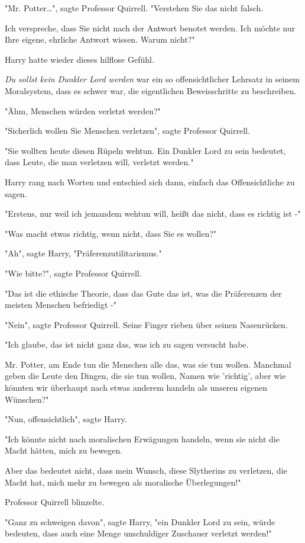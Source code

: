 {"Mr. Potter…", sagte Professor Quirrell. "Verstehen Sie das nicht falsch.

Ich verspreche, dass Sie nicht nach der Antwort benotet werden. Ich möchte nur Ihre eigene, ehrliche Antwort wissen. Warum nicht?"

Harry hatte wieder dieses hilflose Gefühl.

\emph{Du sollst kein Dunkler Lord werden} war ein so offensichtlicher Lehrsatz in seinem Moralsystem, dass es schwer war, die eigentlichen Beweisschritte zu beschreiben.

"Ähm, Menschen würden verletzt werden?"

"Sicherlich wollen Sie Menschen verletzen", sagte Professor Quirrell.

"Sie wollten heute diesen Rüpeln wehtun. Ein Dunkler Lord zu sein bedeutet, dass Leute, die man verletzen will, verletzt werden."

Harry rang nach Worten und entschied sich dann, einfach das Offensichtliche zu sagen.

"Erstens, nur weil ich jemandem wehtun will, heißt das nicht, dass es richtig ist -"

"Was macht etwas richtig, wenn nicht, dass Sie es wollen?"

"Ah", sagte Harry, "Präferenzutilitarismus."

"Wie bitte?", sagte Professor Quirrell.

"Das ist die ethische Theorie, dass das Gute das ist, was die Präferenzen der meisten Menschen befriedigt -"

"Nein", sagte Professor Quirrell. Seine Finger rieben über seinen Nasenrücken.

"Ich glaube, das ist nicht ganz das, was ich zu sagen versucht habe.

Mr. Potter, am Ende tun die Menschen alle das, was sie tun wollen. Manchmal geben die Leute den Dingen, die sie tun wollen, Namen wie 'richtig', aber wie könnten wir überhaupt nach etwas anderem handeln als unseren eigenen Wünschen?"

"Nun, offensichtlich", sagte Harry.

"Ich könnte nicht nach moralischen Erwägungen handeln, wenn sie nicht die Macht hätten, mich zu bewegen.

Aber das bedeutet nicht, dass mein Wunsch, diese Slytherins zu verletzen, die Macht hat, mich mehr zu bewegen als moralische Überlegungen!"

Professor Quirrell blinzelte.

"Ganz zu schweigen davon", sagte Harry, "ein Dunkler Lord zu sein, würde bedeuten, dass auch eine Menge unschuldiger Zuschauer verletzt werden!"

}
